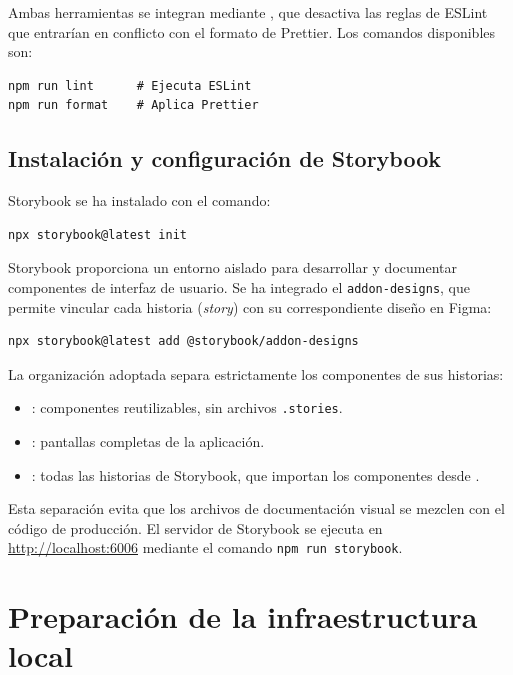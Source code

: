 \documentclass[12pt,a4paper]{report}
\begin{document}
Ambas herramientas se integran mediante , que desactiva las reglas de ESLint que entrarían en conflicto con el formato de Prettier. Los comandos disponibles son:

\begin{verbatim}
npm run lint      # Ejecuta ESLint
npm run format    # Aplica Prettier
\end{verbatim}

\subsection{Instalación y configuración de Storybook}

Storybook se ha instalado con el comando:

\begin{verbatim}
npx storybook@latest init
\end{verbatim}

Storybook proporciona un entorno aislado para desarrollar y documentar componentes de interfaz de usuario. Se ha integrado el \texttt{addon-designs}, que permite vincular cada historia (\textit{story}) con su correspondiente diseño en Figma:

\begin{verbatim}
npx storybook@latest add @storybook/addon-designs
\end{verbatim}

La organización adoptada separa estrictamente los componentes de sus historias:

\begin{itemize}
    \item {}: componentes reutilizables, sin archivos \texttt{.stories}.
    \item {}: pantallas completas de la aplicación.
    \item {}: todas las historias de Storybook, que importan los componentes desde .
\end{itemize}

Esta separación evita que los archivos de documentación visual se mezclen con el código de producción. El servidor de Storybook se ejecuta en \url{http://localhost:6006} mediante el comando \texttt{npm run storybook}.

\section{Preparación de la infraestructura local}
\end{document}
